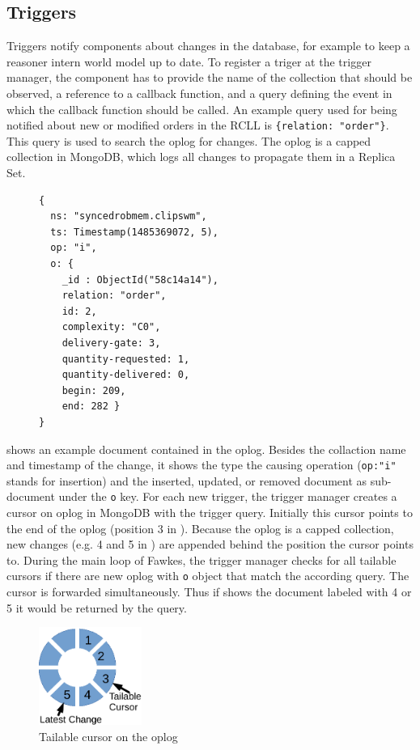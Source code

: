 \subsection{Triggers}
\label{sec:impl-triggers}
Triggers notify components about changes in the database, for example
to keep a reasoner intern world model up to date. To register a triger
at the trigger manager, the component has to provide the name of the
collection that should be observed, a reference to a callback
function, and a query defining the event in which the callback
function should be called. An example query used for being notified
about new or modified orders in the RCLL is \texttt{\{relation:
  "order"\}}. This query is used to search the oplog for changes. The
oplog is a capped collection in MongoDB, which logs all changes to
propagate them in a Replica Set.
\begin{figure}
  \vspace{-0.8cm}
\begin{lstlisting}[style=SmallJSON,
  caption={Document in the oplog},
  label=lst:oplog,
  framexleftmargin=2pt, xleftmargin=0pt,
 morekeywords={}, numbers=none]
{
  ns: "syncedrobmem.clipswm",
  ts: Timestamp(1485369072, 5),
  op: "i",
  o: {
    _id : ObjectId("58c14a14"),
    relation: "order",
    id: 2,
    complexity: "C0",
    delivery-gate: 3,
    quantity-requested: 1,
    quantity-delivered: 0,
    begin: 209,
    end: 282 }
}
\end{lstlisting}
\vspace{-8mm}
\end{figure}
 shows an example document contained in the
oplog. Besides the collaction name and timestamp of the change, it
shows the type the causing operation (\texttt{op:"i"} stands for
insertion) and the inserted, updated, or removed document as
sub-document under the \texttt{o} key. For each new trigger, the
trigger manager creates a cursor on oplog in MongoDB with the trigger
query. Initially this cursor points to the end of the oplog (position
3 in ). Because the oplog is a capped
collection, new changes (e.g. 4 and 5 in )
are appended behind the position the cursor points to. During the main
loop of Fawkes, the trigger manager checks for all tailable cursors if
there are new oplog with \texttt{o} object that match the according
query. The cursor is forwarded simultaneously. Thus if
 shows the document labeled with 4 or 5 it would be
returned by the query.
\begin{figure}
  \centering
  \includegraphics[width=0.3\textwidth]{draw/oplog-cursor}%
  \caption[Tailable cursor on the oplog]{Tailable cursor on the oplog}
  \vspace{-3mm}
  \label{fig:oplog-cursor}
\end{figure}
